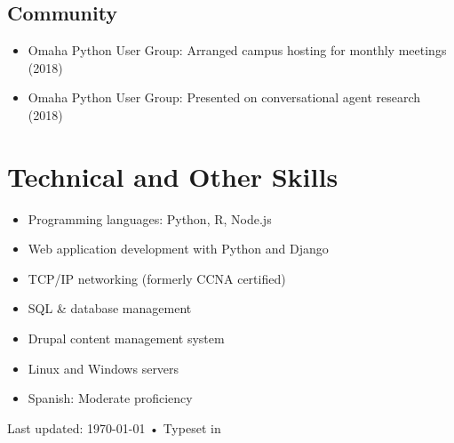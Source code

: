 \documentclass[10pt, letter]{article}
\begin{document}
\subsection*{Community}
\begin{itemize}
\itemsep0em
\item Omaha Python User Group: Arranged campus hosting for monthly meetings (2018)
\item Omaha Python User Group: Presented on conversational agent research (2018)
\end{itemize}



\section*{Technical and Other Skills}

\begin{itemize}
\itemsep0em
\item Programming languages: Python, R, Node.js
\item Web application development with Python and Django
\item TCP/IP networking (formerly CCNA certified)
\item SQL \& database management
\item Drupal content management system
\item Linux and Windows servers
\item Spanish: Moderate proficiency
\end{itemize}


\vfill{}

\begin{center}
{\scriptsize  Last updated: \today\- •\-
Typeset in \href{http://nitens.org/taraborelli/cvtex}{
\XeTeX }\\
}
\end{center}
\end{document}
